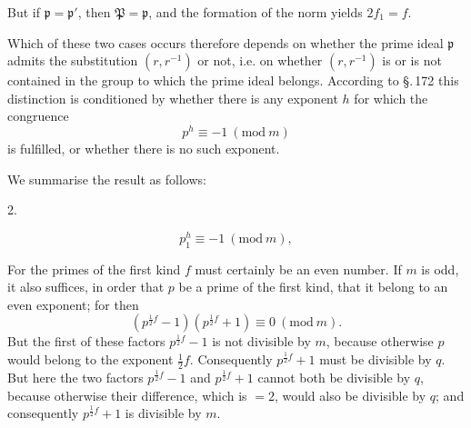 But if $\mathfrak{p}=\mathfrak{p}'$, then $\mathfrak{P}=\mathfrak{p}$, and the formation of the norm yields $2f_1=f$.

Which of these two cases occurs therefore depends on whether the prime ideal $\mathfrak{p}$ admits the substitution $(r,r^{-1})$ or not, i.e. on whether $(r,r^{-1})$ is or is not contained in the group to which the prime ideal belongs. According to \S.\,172 this distinction is conditioned by whether there is any exponent $h$ for which the congruence
\[
p^h \equiv -1 \ (\mathrm{mod}\ m)
\]
is fulfilled, or whether there is no such exponent.

We summarise the result as follows:

2. 

\[
p_1^h \equiv -1 \ (\mathrm{mod}\ m),
\]



For the primes of the first kind $f$ must certainly be an even number. If $m$ is odd, it also suffices, in order that $p$ be a prime of the first kind, that it belong to an even exponent; for then
\[
(p^{\frac12 f}-1)(p^{\frac12 f}+1)\equiv 0\ (\mathrm{mod}\ m).
\]
But the first of these factors $p^{\frac12 f}-1$ is not divisible by $m$, because otherwise $p$ would belong to the exponent $\frac12 f$. Consequently $p^{\frac12 f}+1$ must be divisible by $q$. But here the two factors $p^{\frac12 f}-1$ and $p^{\frac12 f}+1$ cannot both be divisible by $q$, because otherwise their difference, which is $=2$, would also be divisible by $q$; and consequently $p^{\frac12 f}+1$ is divisible by $m$.

